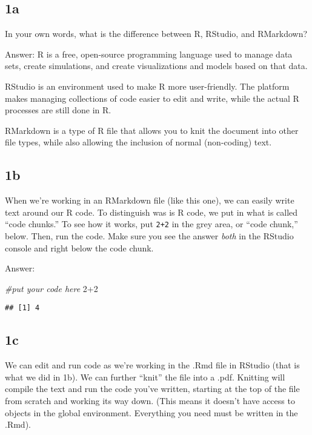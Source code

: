 \documentclass[
]{article}
\newenvironment{Shaded}{\begin{snugshade}}{\end{snugshade}}
\newcommand{\CommentTok}[1]{\textcolor[rgb]{0.56,0.35,0.01}{\textit{#1}}}
\newcommand{\DecValTok}[1]{\textcolor[rgb]{0.00,0.00,0.81}{#1}}
\newcommand{\SpecialCharTok}[1]{\textcolor[rgb]{0.00,0.00,0.00}{#1}}
\begin{document}
\hypertarget{a}{%
\subsection{1a}\label{a}}

In your own words, what is the difference between R, RStudio, and
RMarkdown?

Answer: R is a free, open-source programming language used to manage
data sets, create simulations, and create visualizations and models
based on that data.

RStudio is an environment used to make R more user-friendly. The
platform makes managing collections of code easier to edit and write,
while the actual R processes are still done in R.

RMarkdown is a type of R file that allows you to knit the document into
other file types, while also allowing the inclusion of normal
(non-coding) text.

\hypertarget{b}{%
\subsection{1b}\label{b}}

When we're working in an RMarkdown file (like this one), we can easily
write text around our R code. To distinguish was is R code, we put in
what is called ``code chunks.'' To see how it works, put \texttt{2+2} in
the grey area, or ``code chunk,'' below. Then, run the code. Make sure
you see the answer \emph{both} in the RStudio console and right below
the code chunk.

Answer:

\begin{Shaded}
\begin{Highlighting}[]
\CommentTok{\#put your code here}
\DecValTok{2}\SpecialCharTok{+}\DecValTok{2}
\end{Highlighting}
\end{Shaded}

\begin{verbatim}
## [1] 4
\end{verbatim}

\hypertarget{c}{%
\subsection{1c}\label{c}}

We can edit and run code as we're working in the .Rmd file in RStudio
(that is what we did in 1b). We can further ``knit'' the file into a
.pdf. Knitting will compile the text and run the code you've written,
starting at the top of the file from scratch and working its way down.
(This means it doesn't have access to objects in the global environment.
Everything you need must be written in the .Rmd).
\end{document}
